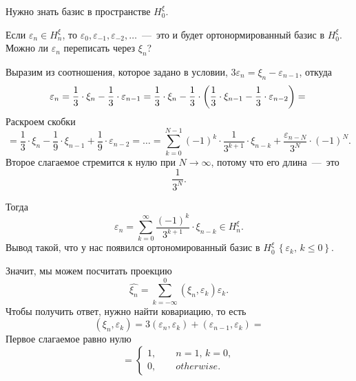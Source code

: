 Нужно знать базис в пространстве $H_0^{ \xi }$.

Если $ \varepsilon_n \in H_n^{ \xi }$,
то $ \varepsilon_0, \varepsilon_{-1}, \varepsilon_{-2}, \dotsc $~---~это
и будет ортонормированный базис в $H_0^{ \xi }$.
Можно ли $ \varepsilon_n$ переписать через $ \xi_n$?

Выразим из соотношения, которое задано в условии, $3 \varepsilon_n = \xi_n - \varepsilon_{n - 1}$,
откуда
\begin{equation*}
  \varepsilon_n =
  \frac{1}{3} \cdot \xi_n - \frac{1}{3} \cdot \varepsilon_{n - 1} =
  \frac{1}{3} \cdot \xi_n -
  \frac{1}{3} \cdot
  \left( \frac{1}{3} \cdot \xi_{n - 1} - \frac{1}{3} \cdot \varepsilon_{n - 2} \right) = \\
\end{equation*}
Раскроем скобки
\begin{equation*}
  = \frac{1}{3} \cdot \xi_n - \frac{1}{9} \cdot \xi_{n - 1} + \frac{1}{9} \cdot \varepsilon_{n - 2} =
  \dotsc =
  \sum \limits_{k = 0}^{N - 1} \left( -1 \right)^k \cdot \frac{1}{3^{k + 1}} \cdot \xi_{n - k} +
  \frac{ \varepsilon_{n - N}}{3^N} \cdot \left( -1 \right)^N.
\end{equation*}
Второе слагаемое стремится к нулю при $N \to \infty $, потому что его длина~---~это
\begin{equation*}
  \frac{1}{3^N}.
\end{equation*}

Тогда
\begin{equation*}
  \varepsilon_n =
  \sum \limits_{k = 0}^{ \infty } \frac{ \left( -1 \right)^k}{3^{k + 1}} \cdot \xi_{n - k} \in
  H_n^{ \xi }.
\end{equation*}
Вывод такой, что у нас появился ортономированный базис в
$H_0^{ \xi } \,
  \left\{ \varepsilon_k, \, k \leq 0 \right\} $.

Значит, мы можем посчитать проекцию
\begin{equation*}
  \hat{ \xi_n} =
  \sum \limits_{k = -\infty }^0 \left( \xi_n, \varepsilon_k \right) \varepsilon_k.
\end{equation*}
Чтобы получить ответ, нужно найти ковариацию, то есть
\begin{equation*}
  \left( \xi_n, \varepsilon_k \right) =
  3 \left( \varepsilon_n, \varepsilon_k \right) +
  \left( \varepsilon_{n - 1}, \varepsilon_k \right) =
\end{equation*}
Первое слагаемое равно нулю
\begin{equation*}
  = \begin{cases}
    1, \qquad n = 1, \, k = 0, \\
    0, \qquad otherwise.
  \end{cases}
\end{equation*}

